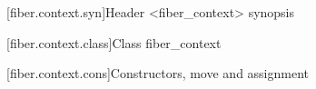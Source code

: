 

[fiber.context.syn]{Header <fiber\_context> synopsis}


[fiber.context.class]{Class fiber\_context}


\newcommand{\state}{\cpp{state}}

[fiber.context.cons]{Constructors, move and assignment}


